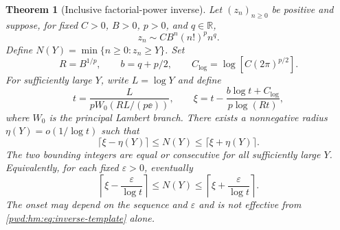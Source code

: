\documentclass[11pt,letterpaper]{article}
\numberwithin{equation}{section}
\newtheorem{theorem}{Theorem}[section]
\theoremstyle{remark}\newtheorem{remark}[theorem]{Remark}
\begin{document}
\begin{theorem}[Inclusive factorial-power inverse]\label{pwd:hm:thm:inverse}
Let $(z_n)_{n\ge0}$ be positive and suppose, for fixed $C>0$, $B>0$, $p>0$, and $q\in\mathbb R$,
\begin{equation}\label{pwd:hm:eq:inverse-template}
 z_n\sim CB^n(n!)^pn^q.
\end{equation}
Define $N(Y)=\min\{n\ge0:z_n\ge Y\}$. Set
\[
 R=B^{1/p},\qquad b=q+p/2,\qquad C_{\log}=\log[C(2\pi)^{p/2}].
\]
For sufficiently large $Y$, write $L=\log Y$ and define
\begin{equation}\label{pwd:hm:eq:inverse-center}
 t=\frac{L}{pW_0(RL/(p\ee))},\qquad
 \xi=t-\frac{b\log t+C_{\log}}{p\log(Rt)},
\end{equation}
where $W_0$ is the principal Lambert branch. There exists a nonnegative radius
$\eta(Y)=o(1/\log t)$ such that
\begin{equation}\label{pwd:hm:eq:two-ceilings}
 \lceil\xi-\eta(Y)\rceil\le N(Y)\le\lceil\xi+\eta(Y)\rceil.
\end{equation}
The two bounding integers are equal or consecutive for all sufficiently large $Y$. Equivalently, for each fixed $\varepsilon>0$, eventually
\begin{equation}\label{pwd:hm:eq:epsilon-ceilings}
 \left\lceil\xi-\frac\varepsilon{\log t}\right\rceil
 \le N(Y)\le
 \left\lceil\xi+\frac\varepsilon{\log t}\right\rceil.
\end{equation}
The onset may depend on the sequence and $\varepsilon$ and is not effective from \eqref{pwd:hm:eq:inverse-template} alone.
\end{theorem}
\end{document}
